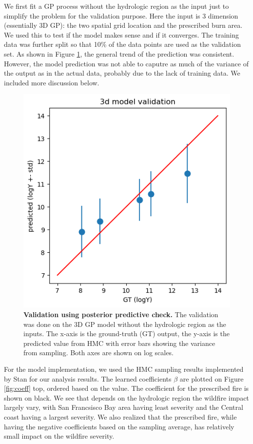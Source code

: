 \documentclass{article}
\begin{document}
We first fit a GP process without the hydrologic region as the input just to simplify the problem for the validation purpose. Here the input is 3 dimension (essentially 3D GP): the two spatial grid location and the prescribed burn area. We used this to test if the model makes sense and if it converges. The training data was further split so that 10\% of the data points are used as the validation set. As shown in Figure \ref{fig:val}, the general trend of the prediction was consistent. However, the model prediction was not able to caputre as much of the variance of the output as in the actual data, probably due to the lack of training data. We included more discussion below. 


\begin{figure}[!t]
  \centering
\includegraphics[width=.6\textwidth]{latex_template/figs/val.png}
\caption{\textbf{Validation using posterior predictive check. } The validation was done on the 3D GP model without the hydrologic region as the inputs. The x-axis is the ground-truth (GT) output, the y-axis is the predicted value from HMC with error bars showing the variance from sampling. Both axes are shown on log scales. }
\label{fig:val}
\end{figure}



For the model implementation, we used the HMC sampling results implemented by Stan for our analysis results. The learned coefficients $\beta$ are plotted on Figure \ref{fig:coeff} top, ordered based on the value. The coefficient for the prescribed fire is shown on black. We see that depends on the hydrologic region the wildfire impact largely vary, with San Francsisco Bay area having least severity and the Central coast having a largest severity. We also realized that the prescribed fire, while having the negative coefficients based on the sampling average, has relatively small impact on the wildfire severity. 
\end{document}
